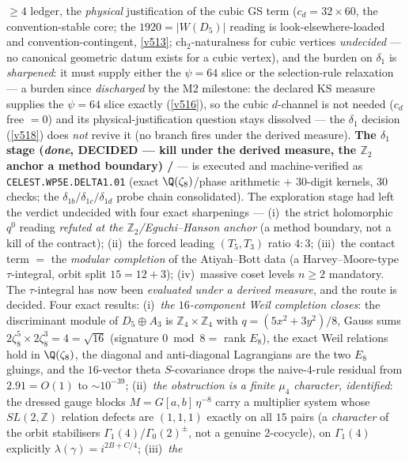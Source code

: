 \documentclass[11pt,a4paper]{article}
\newcommand{\Z}{\mathbb Z}
\begin{document}
\begin{itemize}
\begin{itemize}
$\ge4$ ledger, the \emph{physical} justification of the cubic GS term ($c_d=32\times60$, the
convention-stable core; the $1920=|W(D_5)|$ reading is look-elsewhere-loaded and
convention-contingent, \vref{v513}; ch$_2$-naturalness for cubic vertices \emph{undecided} --- no
canonical geometric datum exists for a cubic vertex), and the burden on $\delta_1$ is
\emph{sharpened}: it must supply either the $\psi=64$ slice or the selection-rule relaxation ---
a burden since \emph{discharged} by the M2 milestone: the declared KS measure supplies the
$\psi=64$ slice exactly (\vref{v516}), so the cubic $d$-channel is not needed ($c_d$ free $=0$)
and its physical-justification question stays dissolved --- the $\delta_1$ decision
(\vref{v518}) does \emph{not} revive it (no branch fires under the derived measure).
\textbf{The $\delta_1$ stage (\emph{done}, DECIDED --- kill under the derived measure, the
$\Z_2$ anchor a method boundary) \mE/\mC} --- is executed and machine-verified as
\texttt{CELEST.WP5E.DELTA1.01}
 (exact $\Q(\zeta_8)$/phase arithmetic
$+$ 30-digit kernels, $30$ checks; the $\delta_{1b}/\delta_{1c}/\delta_{1d}$ probe chain
consolidated). The exploration stage had left the verdict undecided with four exact
sharpenings ---
(i)~the strict holomorphic $q^0$ reading \emph{refuted at the $\Z_2$/Eguchi--Hanson anchor}
(a method boundary, not a kill of the contract); (ii)~the forced leading $(T_5,T_3)$ ratio
$4{:}3$; (iii)~the contact term $=$ the \emph{modular completion} of the Atiyah--Bott data
(a Harvey--Moore-type $\tau$-integral, orbit split $15=12+3$); (iv)~massive coset levels
$n\ge2$ mandatory. The $\tau$-integral has now been \emph{evaluated under a derived measure},
and the route is decided. Four exact results: (i)~\emph{the $16$-component Weil completion
closes}: the discriminant module of $D_5\oplus A_3$ is $\Z_4{\times}\Z_4$ with
$q=(5x^2{+}3y^2)/8$, Gauss sums $2\zeta_8^5\times2\zeta_8^3=4=\sqrt{16}$ (signature $0\bmod8=$
rank $E_8$), the exact Weil relations hold in $\Q(\zeta_8)$, the diagonal and anti-diagonal
Lagrangians are the two $E_8$ gluings, and the $16$-vector theta $S$-covariance drops the
naive-4-rule residual from $2.91=O(1)$ to $\sim10^{-39}$; (ii)~\emph{the obstruction is a
finite $\mu_4$ character, identified}: the dressed gauge blocks $M=G[a,b]\,\eta^{-8}$ carry a
multiplier system whose $SL(2,\Z)$ relation defects are $(1,1,1)$ exactly on all $15$ pairs
(a \emph{character} of the orbit stabilisers $\Gamma_1(4)$/$\Gamma_0(2)^\pm$, not a genuine
2-cocycle), on $\Gamma_1(4)$ explicitly $\lambda(\gamma)=i^{2B+C/4}$; (iii)~\emph{the
}
\end{itemize}
\end{itemize}
\end{document}
